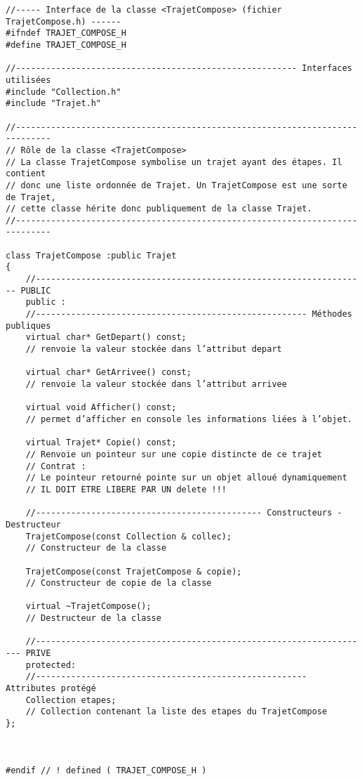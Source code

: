 \begin{verbatim}
//----- Interface de la classe <TrajetCompose> (fichier TrajetCompose.h) ------
#ifndef TRAJET_COMPOSE_H
#define TRAJET_COMPOSE_H

//-------------------------------------------------------- Interfaces utilisées
#include "Collection.h"
#include "Trajet.h"

//-----------------------------------------------------------------------------
// Rôle de la classe <TrajetCompose>
// La classe TrajetCompose symbolise un trajet ayant des étapes. Il contient
// donc une liste ordonnée de Trajet. Un TrajetCompose est une sorte de Trajet,
// cette classe hérite donc publiquement de la classe Trajet.
//-----------------------------------------------------------------------------

class TrajetCompose :public Trajet
{
    //------------------------------------------------------------------ PUBLIC
    public :
    //------------------------------------------------------ Méthodes publiques
    virtual char* GetDepart() const;
    // renvoie la valeur stockée dans l’attribut depart
    
    virtual char* GetArrivee() const;
    // renvoie la valeur stockée dans l’attribut arrivee
    
    virtual void Afficher() const;
    // permet d’afficher en console les informations liées à l’objet.
    
    virtual Trajet* Copie() const;
    // Renvoie un pointeur sur une copie distincte de ce trajet
    // Contrat :
    // Le pointeur retourné pointe sur un objet alloué dynamiquement
    // IL DOIT ETRE LIBERE PAR UN delete !!!
    
    //--------------------------------------------- Constructeurs - Destructeur
    TrajetCompose(const Collection & collec);
    // Constructeur de la classe
    
    TrajetCompose(const TrajetCompose & copie);
    // Constructeur de copie de la classe
    
    virtual ~TrajetCompose();
    // Destructeur de la classe
    
    //------------------------------------------------------------------- PRIVE
    protected:
    //------------------------------------------------------ Attributes protégé
    Collection etapes;
    // Collection contenant la liste des etapes du TrajetCompose
};



#endif // ! defined ( TRAJET_COMPOSE_H )
\end{verbatim}
